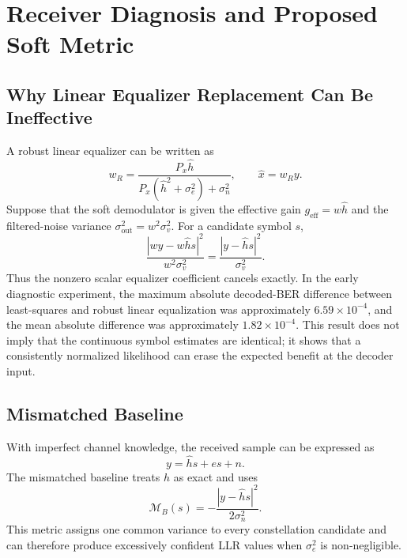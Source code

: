 \documentclass[conference]{IEEEtran}
\newcommand{\BER}{BER}
\newcommand{\LLR}{LLR}
\begin{document}
\section{Receiver Diagnosis and Proposed Soft Metric}
\subsection{Why Linear Equalizer Replacement Can Be Ineffective}
A robust linear equalizer can be written as
\begin{equation}
    w_R=
    \frac{P_x\hat h}
    {P_x(\hat h^2+\sigma_e^2)+\sigma_n^2},
    \qquad
    \hat x=w_Ry.
    \label{eq:robust-linear}
\end{equation}
Suppose that the soft demodulator is given the effective gain $g_{\mathrm{eff}}=w\hat h$ and the filtered-noise variance $\sigma_{\mathrm{out}}^2=w^2\sigma_v^2$. For a candidate symbol $s$,
\begin{equation}
    \frac{|wy-w\hat h s|^2}{w^2\sigma_v^2}
    =
    \frac{|y-\hat h s|^2}{\sigma_v^2}.
    \label{eq:cancellation}
\end{equation}
Thus the nonzero scalar equalizer coefficient cancels exactly. In the early diagnostic experiment, the maximum absolute decoded-\BER{} difference between least-squares and robust linear equalization was approximately $6.59\times10^{-4}$, and the mean absolute difference was approximately $1.82\times10^{-4}$. This result does not imply that the continuous symbol estimates are identical; it shows that a consistently normalized likelihood can erase the expected benefit at the decoder input.

\subsection{Mismatched Baseline}
With imperfect channel knowledge, the received sample can be expressed as
\begin{equation}
    y=\hat h s+es+n.
    \label{eq:received-domain}
\end{equation}
The mismatched baseline treats $\hat h$ as exact and uses
\begin{equation}
    \mathcal M_B(s)
    =-
    \frac{|y-\hat h s|^2}{2\sigma_n^2}.
    \label{eq:mismatched-metric}
\end{equation}
This metric assigns one common variance to every constellation candidate and can therefore produce excessively confident \LLR{} values when $\sigma_e^2$ is non-negligible.
\end{document}

